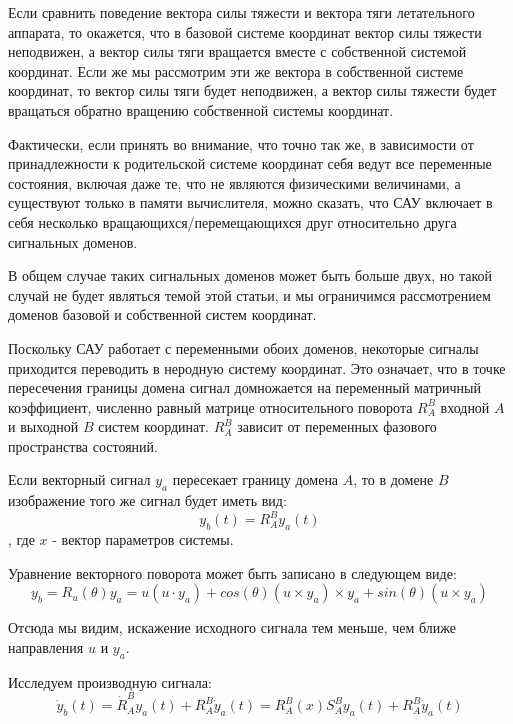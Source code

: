 \documentclass[a4paper]{article}
\begin{document}
Если сравнить поведение вектора силы тяжести и вектора тяги летательного аппарата, то окажется, что в базовой системе координат вектор силы тяжести неподвижен, а вектор силы тяги вращается вместе с собственной системой координат. Если же мы рассмотрим эти же вектора в собственной системе координат, то вектор силы тяги будет неподвижен, а вектор силы тяжести будет вращаться обратно вращению собственной системы координат.

Фактически, если принять во внимание, что точно так же, в зависимости от принадлежности к родительской системе координат себя ведут все переменные состояния, включая даже те, что не являются физическими величинами, а существуют только в памяти вычислителя, можно сказать, что САУ включает в себя несколько вращающихся/перемещающихся друг относительно друга сигнальных доменов.

В общем случае таких сигнальных доменов может быть больше двух, но такой случай не будет являться темой этой статьи, и мы ограничимся рассмотрением доменов базовой и собственной систем координат. 

Поскольку САУ работает с переменными обоих доменов, некоторые сигналы приходится переводить в неродную систему координат. Это означает, что в точке пересечения границы домена сигнал домножается на переменный матричный коэффициент, численно равный матрице относительного поворота $R_A^B$ входной $A$ и выходной $B$ систем координат. $R_A^B$ зависит от переменных фазового пространства состояний.

Если векторный сигнал $y_a$ пересекает границу домена $A$, то в домене $B$ изображение того же сигнал будет иметь вид:
\begin{equation} y_b(t) = R_A^B y_a(t) \end{equation},
где $x$ - вектор параметров системы.  

Уравнение векторного поворота может быть записано в следующем виде:
\begin{equation}
y_b = R_u(\theta)y_a = u(u \cdot y_a) + cos(\theta)(u \times y_a) \times y_a + sin(\theta)(u \times y_a)
\end{equation}

Отсюда мы видим, искажение исходного сигнала тем меньше, чем ближе направления $u$ и $y_a$.

Исследуем производную сигнала:
\begin{equation} \dot{y}_b(t) = \dot{R}_A^B y_a(t) + R_A^B \dot{y}_a(t) = 
R_A^B(x) S_A^B y_a(t) + R_A^B \dot{y}_a(t) \end{equation}
\end{document}
